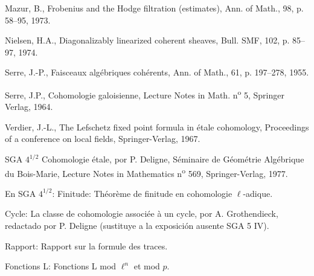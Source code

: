 \begin{enumerate}[label={[\arabic*]},leftmargin=3.5em]
\item Mazur, B., Frobenius and the Hodge filtration (estimates), Ann. of Math., 98, p. 58--95, 1973.
\item Nielsen, H.A., Diagonalizably linearized coherent sheaves, Bull. SMF, 102, p. 85--97, 1974.
\item Serre, J.-P., Faisceaux algébriques cohérents, Ann. of Math., 61, p. 197--278, 1955.
\item Serre, J.P., Cohomologie galoisienne, Lecture Notes in Math. n\textsuperscript{o} 5, Springer Verlag, 1964.
\item Verdier, J.-L., The Lefschetz fixed point formula in étale cohomology, Proceedings of a conference on local fields, Springer-Verlag, 1967.
\end{enumerate}

SGA $4^{1/2}$ Cohomologie étale, por P. Deligne, Séminaire de Géométrie Algébrique du Bois-Marie, Lecture Notes in Mathematics n\textsuperscript{o} 569, Springer-Verlag, 1977.

En SGA $4^{1/2}$: Finitude: Théorème de finitude en cohomologie $\ell$-adique.

Cycle: La classe de cohomologie associée à un cycle, por A. Grothendieck, redactado por P. Deligne (sustituye a la exposición ausente SGA 5 IV).

Rapport: Rapport sur la formule des traces.

Fonctions L: Fonctions L mod $\ell^n$ et mod $p$.

\clearpage
